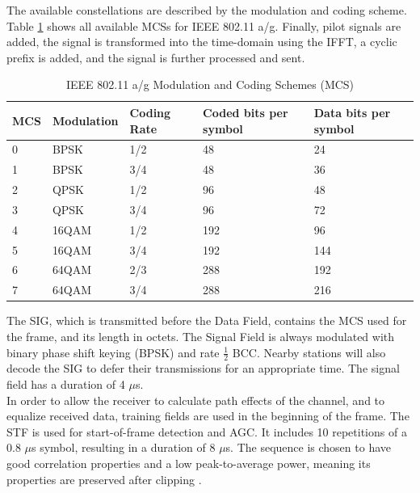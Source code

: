 The available constellations are described by the modulation and coding scheme. Table \ref{tbl:mcs} shows all available \glspl{MCS} for \gls{IEEE} 802.11 a/g. Finally, pilot signals are added, the signal is transformed into the time-domain using the \gls{IFFT}, a cyclic prefix is added, and the signal is further processed and sent.

\begin{table}[ht]
	\centering
	\begin{tabular}{|p{2.5cm}|p{2.5cm}|p{2.5cm}|p{2.5cm}|p{2.5cm}|}
		\hline
		\textbf{MCS} & \textbf{Modulation} & \textbf{Coding Rate} & \textbf{Coded bits per symbol} & \textbf{Data bits per symbol} \\ \hline
		0 & BPSK & 1/2 & 48 & 24 \\ \hline
		1 & BPSK & 3/4 & 48 & 36 \\ \hline
		2 & QPSK & 1/2 & 96 & 48 \\ \hline
		3 & QPSK & 3/4 & 96 & 72 \\ \hline
		4 & 16QAM & 1/2 & 192 & 96 \\ \hline
		5 & 16QAM & 3/4 & 192 & 144 \\ \hline
		6 & 64QAM & 2/3 & 288 & 192 \\ \hline
		7 & 64QAM & 3/4 & 288 & 216 \\ \hline
	\end{tabular}
	\caption[IEEE 802.11 a/g Modulation and Coding Schemes]{IEEE 802.11 a/g Modulation and Coding Schemes (MCS) \cite{ieee2012} \label{tbl:mcs}}
\end{table}

The \gls{SIG}, which is transmitted before the Data Field, contains the \gls{MCS} used for the frame, and its length in octets. The Signal Field is always modulated with binary phase shift keying (BPSK) and rate $\frac{1}{2}$ \gls{BCC}. Nearby stations will also decode the \gls{SIG} to defer their transmissions for an appropriate time. The signal field has a duration of 4 $\mu$s.\\

In order to allow the receiver to calculate path effects of the channel, and to equalize received data, training fields are used in the beginning of the frame. The \gls{STF} is used for start-of-frame detection and \gls{AGC}. It includes 10 repetitions of a 0.8 $\mu$s symbol, resulting in a duration of 8 $\mu$s. The sequence is chosen to have good correlation properties and a low peak-to-average power, meaning its properties are preserved after clipping \cite{perahia2013}.

